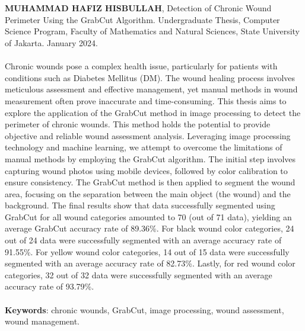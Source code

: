 \chapter*{}
\singlespacing{}

\textbf{MUHAMMAD HAFIZ HISBULLAH}, Detection of Chronic Wound Perimeter Using the 
GrabCut Algorithm. Undergraduate Thesis, Computer Science Program, Faculty of 
Mathematics and Natural Sciences, State University of Jakarta. January 2024.
\\
\\
Chronic wounds pose a complex health issue, particularly for patients with conditions 
such as Diabetes Mellitus (DM). The wound healing process involves meticulous assessment 
and effective management, yet manual methods in wound measurement often prove inaccurate 
and time-consuming. This thesis aims to explore the application of the GrabCut method 
in image processing to detect the perimeter of chronic wounds. This method holds 
the potential to provide objective and reliable wound assessment analysis. Leveraging 
image processing technology and machine learning, we attempt to overcome the limitations 
of manual methods by employing the GrabCut algorithm. The initial step involves 
capturing wound photos using mobile devices, followed by color calibration to ensure 
consistency. The GrabCut method is then applied to segment the wound area, focusing 
on the separation between the main object (the wound) and the background. The final 
results show that data successfully segmented using GrabCut for all wound categories 
amounted to 70 (out of 71 data), yielding an average GrabCut accuracy rate of 89.36\%. 
For black wound color categories, 24 out of 24 data were successfully segmented 
with an average accuracy rate of 91.55\%. For yellow wound color categories, 
14 out of 15 data were successfully segmented with an average accuracy rate of 82.73\%. 
Lastly, for red wound color categories, 32 out of 32 data were successfully segmented 
with an average accuracy rate of 93.79\%.
\\
\\
\textbf{Keywords}: chronic wounds, GrabCut, image processing, wound assessment, wound management.
